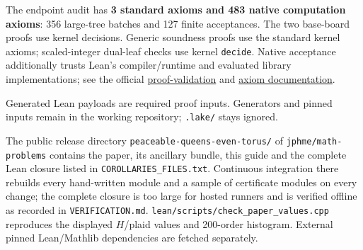 \documentclass[11pt,a4paper]{article}
\newcommand{\topic}[1]{\par\vspace{6pt}{\large\bfseries\color{ink}#1}\par\vspace{2pt}}
\newcommand{\file}[1]{\mbox{\small\nolinkurl{#1}}}
\begin{document}
\topic{Trust and the public release}
The endpoint audit has \textbf{3 standard axioms and 483 native
computation axioms}: 356 large-tree batches and 127 finite acceptances.
The two base-board proofs use kernel decisions. Generic soundness proofs use the standard kernel
axioms; scaled-integer dual-leaf checks use kernel \file{decide}.
Native acceptance additionally trusts Lean's compiler/runtime and evaluated
library implementations; see the official
\href{https://lean-lang.org/doc/reference/latest/ValidatingProofs/}{proof-validation}
and \href{https://lean-lang.org/doc/reference/latest/Axioms/}{axiom documentation}.

Generated Lean payloads are required proof inputs. Generators and pinned
inputs remain in the working repository; \file{.lake/} stays ignored.

The public release directory \file{peaceable-queens-even-torus/} of
\file{jphme/math-problems} contains the paper, its ancillary bundle, this
guide and the complete Lean closure listed in \file{COROLLARIES_FILES.txt}.
Continuous integration there rebuilds every hand-written module and a sample
of certificate modules on every change; the complete closure is too large for
hosted runners and is verified offline as recorded in \file{VERIFICATION.md}.
\file{lean/scripts/check_paper_values.cpp} reproduces the displayed $H$/plaid
values and 200-order histogram. External pinned Lean/Mathlib dependencies are
fetched separately.
\end{document}
